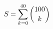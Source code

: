 \documentclass[preview]{standalone}
\begin{document}
\begin{align*}
\special{dvisvgm:raw <g id='unique000'>}S=\sum_{k=0}^{40}\binom{100}{k}\special{dvisvgm:raw </g>}
\end{align*}
\end{document}
